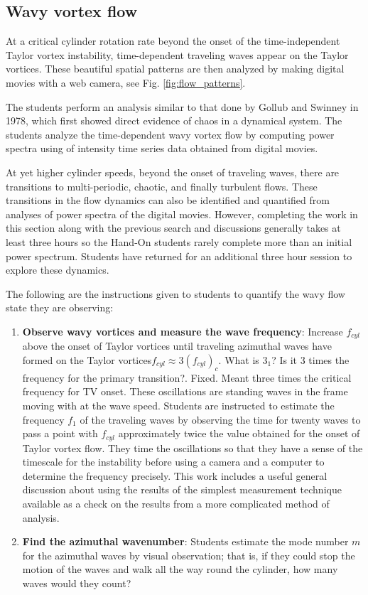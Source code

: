 \documentclass[%
reprint,
 amsmath,amssymb,
 aps,
prb,
floatfix,
longbibliography,
notitlepage
]{revtex4-1}
\newcommand{\DB}[1]{{\color{red}#1}} %
\newcommand{\BR}[1]{{\color{blue}#1}} %
\begin{document}
\subsection{Wavy vortex flow}

At a critical cylinder rotation rate beyond the onset of the  time-independent Taylor vortex instability, time-dependent traveling waves appear on the Taylor vortices. These beautiful spatial patterns are then analyzed by making digital movies with a web camera, see Fig. \ref{fig:flow_patterns}.

 The students perform an analysis similar to that done by Gollub and Swinney in 1978,\cite{gollub_swinney_1978} which first showed direct evidence of chaos in a dynamical system. The students analyze the time-dependent wavy vortex flow by computing power spectra using of intensity time series data obtained from digital movies.  

At yet higher cylinder speeds, beyond the onset of traveling waves, there are transitions to multi-periodic, chaotic, and finally turbulent flows.  These transitions in the flow dynamics can also be identified and quantified from analyses of  power spectra of the digital movies. However, completing the work in this section along with the previous search and discussions generally takes at least three hours so the Hand-On students rarely complete more than an initial power spectrum. Students have returned for an additional three hour session to explore these dynamics.

The following are the instructions given to students to quantify the wavy flow state they are observing:

\begin{enumerate}
\item {\bf Observe wavy vortices and measure the wave frequency}: Increase $f_{cyl}$ above the onset of Taylor vortices until traveling azimuthal waves have formed on the Taylor vortices$f_{cyl}\approx 3(f_{cyl})_c$. \DB{What is $3_1$? Is it 3 times the frequency for the primary transition?}. \BR{Fixed. Meant three times the critical frequency for TV onset.} These oscillations are standing waves in the frame moving with at the wave speed. Students are instructed to estimate the frequency $f_1$ of the traveling waves by observing the time for twenty waves to pass a point with $f_{cyl}$ approximately twice the value obtained for the onset of Taylor vortex flow. They time the oscillations so that they have a sense of the timescale for the instability before using a camera and a computer to determine the frequency precisely. This work includes a useful general discussion about using the results of the simplest measurement technique available as a check on the results from a more complicated method of analysis.

\item {\bf Find the azimuthal wavenumber}:  Students estimate  the mode number $m$ for the azimuthal waves by visual observation; that is, if they could stop the motion of the waves and walk all the way round the cylinder, how many waves would they count?

\end{enumerate}
\end{document}
